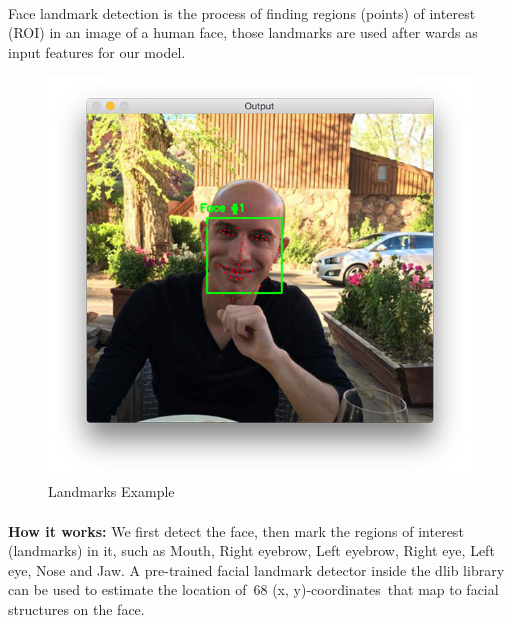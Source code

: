 \paragraph{}
Face landmark detection is the process of finding regions (points) of interest (ROI) in an image of a human face, those landmarks are used after wards as input features for our model.
\begin{figure}[H]
	\centering
	\includegraphics[width=\linewidth]{images/lm1.jpg}
	\caption{Landmarks Example}
\end{figure}
\paragraph{}
\textbf{How it works:}\newline
We first detect the face, then mark the regions of interest (landmarks) in it, such as Mouth, Right eyebrow, Left eyebrow, Right eye, Left eye, Nose and Jaw.\newline
A pre-trained facial landmark detector inside the dlib library can be used to estimate the location of 68 (x, y)-coordinates that map to facial structures on the face.

